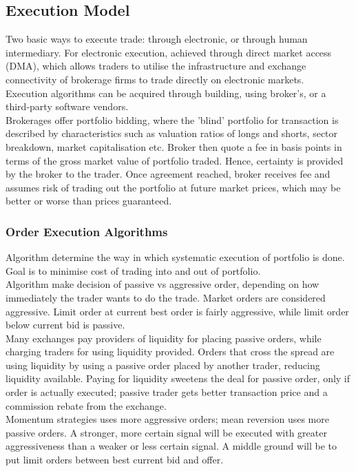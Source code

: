 \subsection{Execution Model}

Two basic ways to execute trade: through electronic, or through human intermediary. For electronic execution, achieved through direct market access (DMA), which allows traders to utilise the infrastructure and exchange connectivity of brokerage firms to trade directly on electronic markets.\\
Execution algorithms can be acquired through building, using broker's, or a third-party software vendors.\\

Brokerages offer portfolio bidding, where the 'blind' portfolio for transaction is described by characteristics such as valuation ratios of longs and shorts, sector breakdown, market capitalisation etc. Broker then quote a fee in basis points in terms of the gross market value of portfolio traded. Hence, certainty is provided by the broker to the trader. Once agreement reached, broker receives fee and assumes risk of trading out the portfolio at future market prices, which may be better or worse than prices guaranteed.

\subsubsection{Order Execution Algorithms}

Algorithm determine the way in which systematic execution of portfolio is done. Goal is to minimise cost of trading into and out of portfolio. \\

 Algorithm make decision of passive vs aggressive order, depending on how immediately the trader wants to do the trade. Market orders are considered aggressive. Limit order at current best order is fairly aggressive, while limit order below current bid is passive.\\
Many exchanges pay providers of liquidity for placing passive orders, while charging traders for using liquidity provided. Orders that cross the spread are using liquidity by using a passive order placed by another trader, reducing liquidity available. Paying for liquidity sweetens the deal for passive order, only if order is actually executed; passive trader gets better transaction price and a commission rebate from the exchange.\\
Momentum strategies uses more aggressive orders; mean reversion uses more passive orders. A stronger, more certain signal will be executed with greater aggressiveness than a weaker or less certain signal. A middle ground will be to put limit orders between best current bid and offer.\\

